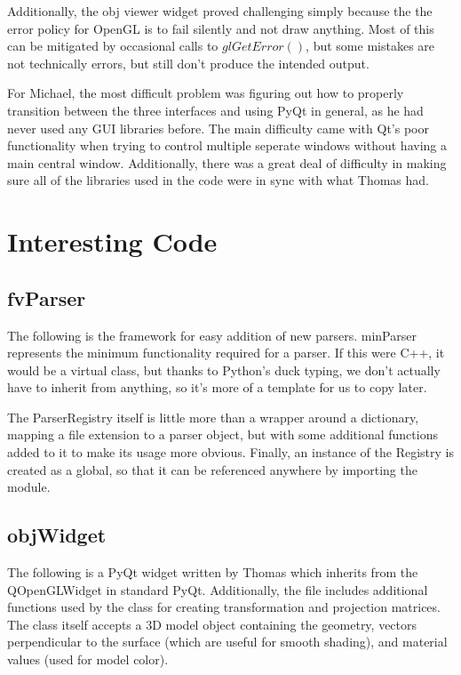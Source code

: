 \documentclass[letterpaper,10pt, onecolumn, draftclsnofoot]{IEEEtran}
\begin{document}
Additionally, the obj viewer widget proved challenging simply because the the error policy for OpenGL is to fail silently and not draw anything. Most of this can be mitigated by occasional calls to $glGetError()$, but some mistakes are not technically errors, but still don't produce the intended output.

For Michael, the most difficult problem was figuring out how to properly transition between the three interfaces and using PyQt in general, as he had never used any GUI libraries before. The main difficulty came with Qt's poor functionality when trying to control multiple seperate windows without having a main central window. Additionally, there was a great deal of difficulty in making sure all of the libraries used in the code were in sync with what Thomas had.

\section{Interesting Code} \label{interestingCode}

\subsection{fvParser} 

The following is the framework for easy addition of new parsers. minParser represents the minimum functionality required for a parser. If this were C++, it would be a virtual class, but thanks to Python's duck typing, we don't actually have to inherit from anything, so it's more of a template for us to copy later.

The ParserRegistry itself is little more than a wrapper around a dictionary, mapping a file extension to a parser object, but with some additional functions added to it to make its usage more obvious. Finally, an instance of the Registry is created as a global, so that it can be referenced anywhere by importing the module.



\subsection{objWidget} 

The following is a PyQt widget written by Thomas which inherits from the QOpenGLWidget in standard PyQt. Additionally, the file includes additional functions used by the class for creating transformation and projection matrices. The class itself accepts a 3D model object containing the geometry, vectors perpendicular to the surface (which are useful for smooth shading), and material values (used for model color). 
\end{document}
